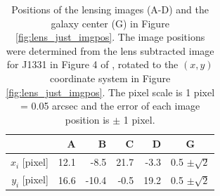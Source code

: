 \begin{table}
\centering
\begin{minipage}{70mm}
\begin{tabular}{r|rrrr|c}
\hline
  & A & B & C & D & G\\\hline
$x_i$ [pixel] & 12.1 & -8.5 & 21.7 & -3.3 & 0.5 $\pm \sqrt{2}$ \\
$y_i$ [pixel] & 16.6 & -10.4 & -0.5 & 19.2 & 0.5 $\pm \sqrt{2}$ \\
\hline
\end{tabular}
\caption{Positions of the lensing images (A-D) and the galaxy center (G) in Figure \ref{fig:lens_just_imgpos}. The image positions were determined from the lens subtracted image for J1331 in Figure 4 of \citet{SWELLSIII}, rotated to the $(x,y)$ coordinate system in Figure \ref{fig:lens_just_imgpos}. The pixel scale is 1 pixel = 0.05 arcsec and the error of each image position is $\pm$ 1 pixel.}
\label{tab:lenspos}
\end{minipage}
\end{table}


